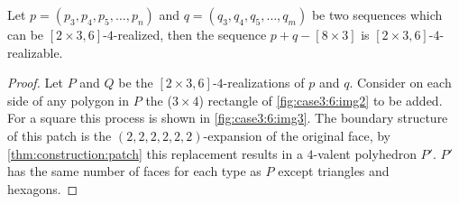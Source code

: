 \begin{lemma}\label{thm:case3:6:compose}
  Let $p = (p_3, p_4, p_5, \dots, p_n)$ and $q = (q_3, q_4, q_5, \dots, q_m)$ be two sequences which can be $[2 \times 3, 6]$-$4$-realized, then the sequence $p + q - [8 \times 3]$ is $[2\times3, 6]$-$4$-realizable.
  \begin{proof}
    Let $P$ and $Q$ be the $[2 \times 3, 6]$-$4$-realizations of $p$ and $q$. Consider on each side of any polygon in $P$ the ($3 \times 4$) rectangle of \autoref{fig:case3:6:img2} to be added. For a square this process is shown in \autoref{fig:case3:6:img3}. The boundary structure of this patch is the $(2, 2, 2, 2, 2, 2)$-expansion of the original face, by \autoref{thm:construction:patch} this replacement results in a $4$-valent polyhedron $P'$. $P'$ has the same number of faces for each type as $P$ except triangles and hexagons.


\end{proof}
\end{lemma}

